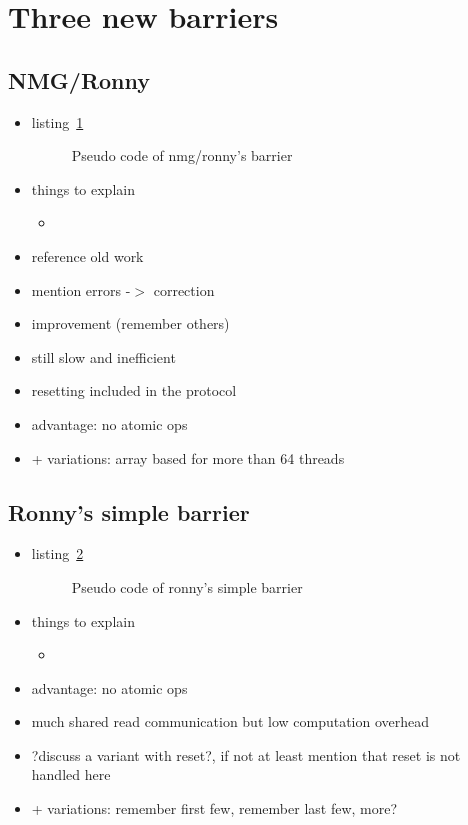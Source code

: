 \documentclass[a4paper, 10pt]{article}
\begin{document}
\section{Three new barriers}
\subsection{NMG/Ronny}
\begin{itemize}
	\item listing~\ref{listing:nmg-ronny-with-reset}
		\begin{figure}[htbp]
			\centering
			
			\caption{Pseudo code of nmg/ronny's barrier}
			\label{listing:nmg-ronny-with-reset}
		\end{figure}

	\item things to explain
		\begin{itemize}
			\item ~
		\end{itemize}

	\item reference old work
	\item mention errors -$>$ correction
	\item improvement (remember others)
	\item still slow and inefficient
	\item resetting included in the protocol
	\item advantage: no atomic ops
	\item + variations: array based for more than 64 threads
\end{itemize}

\subsection{Ronny's simple barrier}
\begin{itemize}
	\item listing~\ref{listing:ronny-simple-no-reset}
		\begin{figure}[htbp]
			\centering
			
			\caption{Pseudo code of ronny's simple barrier}
			\label{listing:ronny-simple-no-reset}
		\end{figure}

	\item things to explain
		\begin{itemize}
			\item ~
		\end{itemize}

	\item advantage: no atomic ops
	\item much shared read communication but low computation overhead
	\item ?discuss a variant with reset?, if not at least mention that reset is not handled here
	\item + variations: remember first few, remember last few, more?
\end{itemize}
\end{document}
